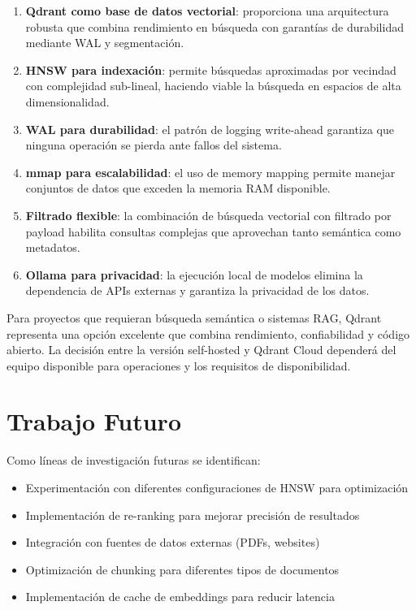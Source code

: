 \documentclass[conference]{IEEEtran}
\begin{document}
\begin{enumerate}
    \item \textbf{Qdrant como base de datos vectorial}: proporciona una arquitectura robusta que combina rendimiento en búsqueda con garantías de durabilidad mediante WAL y segmentación.
    
    \item \textbf{HNSW para indexación}: permite búsquedas aproximadas por vecindad con complejidad sub-lineal, haciendo viable la búsqueda en espacios de alta dimensionalidad.
    
    \item \textbf{WAL para durabilidad}: el patrón de logging write-ahead garantiza que ninguna operación se pierda ante fallos del sistema.
    
    \item \textbf{mmap para escalabilidad}: el uso de memory mapping permite manejar conjuntos de datos que exceden la memoria RAM disponible.
    
    \item \textbf{Filtrado flexible}: la combinación de búsqueda vectorial con filtrado por payload habilita consultas complejas que aprovechan tanto semántica como metadatos.
    
    \item \textbf{Ollama para privacidad}: la ejecución local de modelos elimina la dependencia de APIs externas y garantiza la privacidad de los datos.
\end{enumerate}

Para proyectos que requieran búsqueda semántica o sistemas RAG, Qdrant representa una opción excelente que combina rendimiento, confiabilidad y código abierto. La decisión entre la versión self-hosted y Qdrant Cloud dependerá del equipo disponible para operaciones y los requisitos de disponibilidad.

\section{Trabajo Futuro}
\label{sec:trabajo_futuro}

Como líneas de investigación futuras se identifican:

\begin{itemize}
    \item Experimentación con diferentes configuraciones de HNSW para optimización
    \item Implementación de re-ranking para mejorar precisión de resultados
    \item Integración con fuentes de datos externas (PDFs, websites)
    \item Optimización de chunking para diferentes tipos de documentos
    \item Implementación de cache de embeddings para reducir latencia
\end{itemize}
\end{document}
